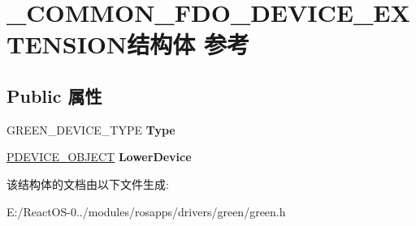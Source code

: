 \hypertarget{struct___c_o_m_m_o_n___f_d_o___d_e_v_i_c_e___e_x_t_e_n_s_i_o_n}{}\section{\+\_\+\+C\+O\+M\+M\+O\+N\+\_\+\+F\+D\+O\+\_\+\+D\+E\+V\+I\+C\+E\+\_\+\+E\+X\+T\+E\+N\+S\+I\+O\+N结构体 参考}
\label{struct___c_o_m_m_o_n___f_d_o___d_e_v_i_c_e___e_x_t_e_n_s_i_o_n}
\subsection*{Public 属性}
\begin{DoxyCompactItemize}
\item 
\mbox{\label{struct___c_o_m_m_o_n___f_d_o___d_e_v_i_c_e___e_x_t_e_n_s_i_o_n_aa0a518c5e876bcdf6bce6c618045ac25}} 
G\+R\+E\+E\+N\+\_\+\+D\+E\+V\+I\+C\+E\+\_\+\+T\+Y\+PE {\bfseries Type}
\item 
\mbox{\label{struct___c_o_m_m_o_n___f_d_o___d_e_v_i_c_e___e_x_t_e_n_s_i_o_n_acbaf5c0e9c1a2c55fd95cbd79fabe954}} 
\hyperlink{struct___d_e_v_i_c_e___o_b_j_e_c_t}{P\+D\+E\+V\+I\+C\+E\+\_\+\+O\+B\+J\+E\+CT} {\bfseries Lower\+Device}
\end{DoxyCompactItemize}


该结构体的文档由以下文件生成\+:\begin{DoxyCompactItemize}
\item 
E\+:/\+React\+O\+S-\/0../modules/rosapps/drivers/green/green.\+h\end{DoxyCompactItemize}
